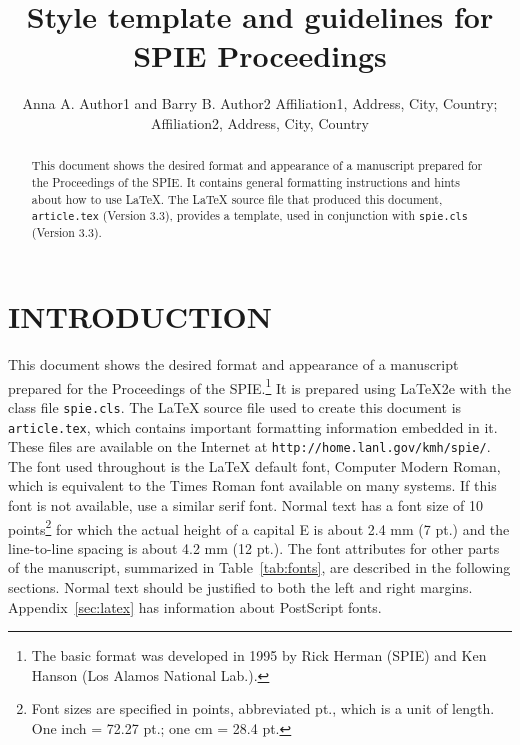 \documentclass[]{spie}  %
\title{Style template and guidelines for SPIE Proceedings}
\author{Anna A. Author1\supit{a} and Barry B. Author2\supit{b}
\skiplinehalf
\supit{a}Affiliation1, Address, City, Country; \\
\supit{b}Affiliation2, Address, City, Country
}
\begin{document}
 
  \maketitle 

\begin{abstract}
This document shows the desired format and appearance of a manuscript prepared for the Proceedings of the SPIE.  It contains general formatting instructions and hints about how to use LaTeX.  The LaTeX source file that produced this document, {\tt article.tex} (Version 3.3), provides a template, used in conjunction with {\tt spie.cls} (Version 3.3).  
\end{abstract}



\section{INTRODUCTION}
\label{sec:intro}  %

This document shows the desired format and appearance of a manuscript prepared for the Proceedings of the SPIE.\footnote{The basic format was developed in 1995 by Rick Herman (SPIE) and Ken Hanson (Los Alamos National Lab.).} It is prepared using LaTeX2e\cite{Lamport94} with the class file {\tt spie.cls}.  The LaTeX source file used to create this document is {\tt article.tex}, which contains important formatting information embedded in it.  These files are available on the Internet at {\tt http://home.lanl.gov/kmh/spie/}.  The font used throughout is the LaTeX default font, Computer Modern Roman, which is equivalent to the Times Roman font available on many systems.  If this font is not available, use a similar serif font.  Normal text has a font size of 10 points\footnote{Font sizes are specified in points, abbreviated pt., which is a unit of length.  One inch = 72.27 pt.; one cm = 28.4 pt.} for which the actual height of a capital E is about 2.4 mm (7 pt.) and the line-to-line spacing is about 4.2 mm (12 pt.).  The font attributes for other parts of the manuscript, summarized in Table~\ref{tab:fonts}, are described in the following sections.  Normal text should be justified to both the left and right margins.  Appendix~\ref{sec:latex} has information about PostScript fonts.
\end{document}
